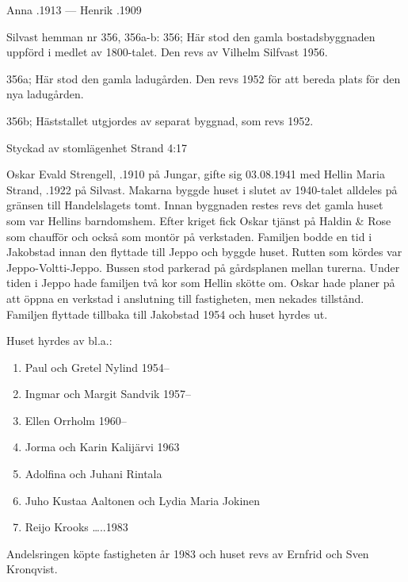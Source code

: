 Anna .1913  ---  Henrik .1909

Silvast hemman nr 356, 356a-b:
356; Här stod den gamla bostadsbyggnaden uppförd i medlet av 1800-talet. Den revs av Vilhelm Silfvast 1956.

356a; Här stod den gamla ladugården. Den revs 1952 för att bereda plats för den nya ladugården.

356b; Häststallet utgjordes av separat byggnad, som revs 1952.



%

Styckad av stomlägenhet Strand 4:17


%
Oskar Evald Strengell, .1910 på Jungar, gifte sig 03.08.1941 med Hellin Maria Strand, .1922 på Silvast. Makarna byggde huset i slutet av 1940-talet alldeles på gränsen till Handelslagets tomt. Innan byggnaden restes revs det gamla huset som var Hellins barndomshem. Efter kriget fick Oskar tjänst på Haldin \& Rose som chaufför och också som montör på verkstaden. Familjen bodde en tid i Jakobstad innan den flyttade till Jeppo och byggde huset. Rutten som kördes var Jeppo-Voltti-Jeppo. Bussen stod parkerad på gårdsplanen mellan turerna. Under tiden i Jeppo hade familjen två kor som Hellin skötte om. Oskar hade planer på att öppna en verkstad i anslutning till fastigheten, men nekades tillstånd. Familjen flyttade tillbaka till Jakobstad 1954 och huset hyrdes ut.
\begin{jhchildren}
  \item {}
  \item {}
\end{jhchildren}

Huset hyrdes av bl.a.:
\begin{enumerate}
  \item Paul och Gretel Nylind  1954--
  \item Ingmar och Margit Sandvik 1957--
  \item Ellen Orrholm 1960--
  \item Jorma och Karin Kalijärvi 1963
  \item Adolfina och Juhani Rintala
  \item Juho Kustaa Aaltonen och Lydia Maria Jokinen
  \item Reijo Krooks   …..1983
\end{enumerate}
Andelsringen köpte fastigheten år 1983 och huset revs av Ernfrid och Sven Kronqvist.



